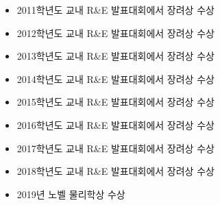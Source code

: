 \documentclass{gshs_thesis}
\begin{document}
\begin{researches}
\begin{itemize}
\item{2011학년도 교내 R\&E 발표대회에서 장려상 수상}
\item{2012학년도 교내 R\&E 발표대회에서 장려상 수상}
\item{2013학년도 교내 R\&E 발표대회에서 장려상 수상}
\item{2014학년도 교내 R\&E 발표대회에서 장려상 수상}
\item{2015학년도 교내 R\&E 발표대회에서 장려상 수상}
\item{2016학년도 교내 R\&E 발표대회에서 장려상 수상}
\item{2017학년도 교내 R\&E 발표대회에서 장려상 수상}
\item{2018학년도 교내 R\&E 발표대회에서 장려상 수상}
\item{2019년 노벨 물리학상 수상}
\end{itemize}
\end{researches}
\end{document}
